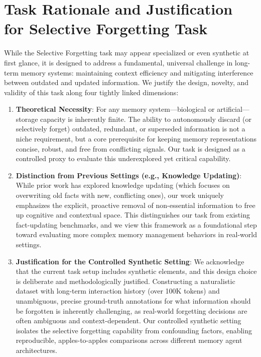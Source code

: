 \section{Task Rationale and Justification for Selective Forgetting Task}
\label{app:selective_forgetting}

While the Selective Forgetting task may appear specialized or even synthetic at first glance, it is designed to address a fundamental, universal challenge in long-term memory systems: maintaining context efficiency and mitigating interference between outdated and updated information. We justify the design, novelty, and validity of this task along four tightly linked dimensions:
\begin{enumerate}
    \item \textbf{Theoretical Necessity}: For any memory system—biological or artificial—storage capacity is inherently finite. The ability to autonomously discard (or selectively forget) outdated, redundant, or superseded information is not a niche requirement, but a core prerequisite for keeping memory representations concise, robust, and free from conflicting signals. Our task is designed as a controlled proxy to evaluate this underexplored yet critical capability.
    
    \item \textbf{Distinction from Previous Settings (e.g., Knowledge Updating)}: While prior work has explored knowledge updating (which focuses on overwriting old facts with new, conflicting ones), our work uniquely emphasizes the explicit, proactive removal of non-essential information to free up cognitive and contextual space. This distinguishes our task from existing fact-updating benchmarks, and we view this framework as a foundational step toward evaluating more complex memory management behaviors in real-world settings.
    
    \item \textbf{Justification for the Controlled Synthetic Setting}: We acknowledge that the current task setup includes synthetic elements, and this design choice is deliberate and methodologically justified. Constructing a naturalistic dataset with long-term interaction history (over 100K tokens) and unambiguous, precise ground-truth annotations for what information should be forgotten is inherently challenging, as real-world forgetting decisions are often ambiguous and context-dependent. Our controlled synthetic setting isolates the selective forgetting capability from confounding factors, enabling reproducible, apples-to-apples comparisons across different memory agent architectures.
    

\end{enumerate}
